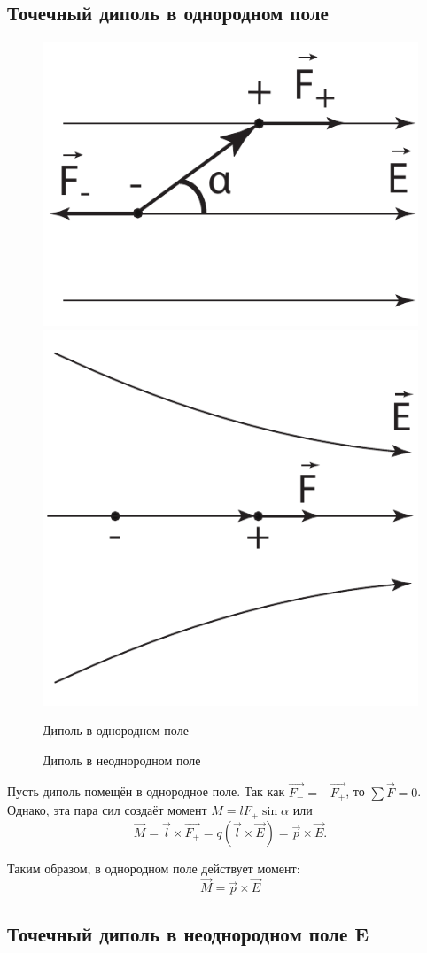 \subsection{Точечный диполь в однородном поле}
    \begin{figure}[b]
        \center
        \includegraphics[width=.47\textwidth]{lec03/dipole_homogeneous.pdf}
        \hfill
        \includegraphics[width=.47\textwidth]{lec03/dipole_inhomogeneous.pdf}
        \parbox[t]{.47\textwidth}{\caption{Диполь в однородном поле}}
        \hfill
        \parbox[t]{.47\textwidth}{\caption{Диполь в неоднородном поле}}
    \end{figure}

    Пусть диполь помещён в однородное поле. Так как
    \( \vec{F_{-}} = -\vec{F_{+}} \), то \( \sum\vec{F} = 0 \). Однако, эта 
    пара сил создаёт момент \( M = lF_{+}\sin\alpha \) или
    \[
        \vec{M} = \vec{l}\times\vec{F_{+}} = q(\vec{l}\times\vec{E}) = 
        \vec{p}\times\vec{E}.
    \]
    
    Таким образом, в однородном поле действует момент:
    \begin{equation}
        \vec{M} = \vec{p}\times\vec{E}
    \end{equation}

    \subsection{Точечный диполь в неоднородном поле \textbf{E}}

